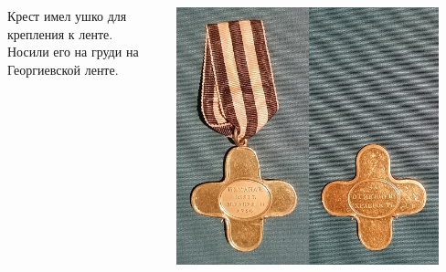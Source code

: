 \begin{frame}{}
	\begin{columns}
		\begin{column}{0.45\textwidth}

			Крест имел ушко для крепления к ленте. Носили его на груди на Георгиевской ленте.

		\end{column}
		\begin{column}{0.45\textwidth}

			\includegraphics[width=0.9\textwidth]{medal2.jpg}

		\end{column}
	\end{columns}
\end{frame}
